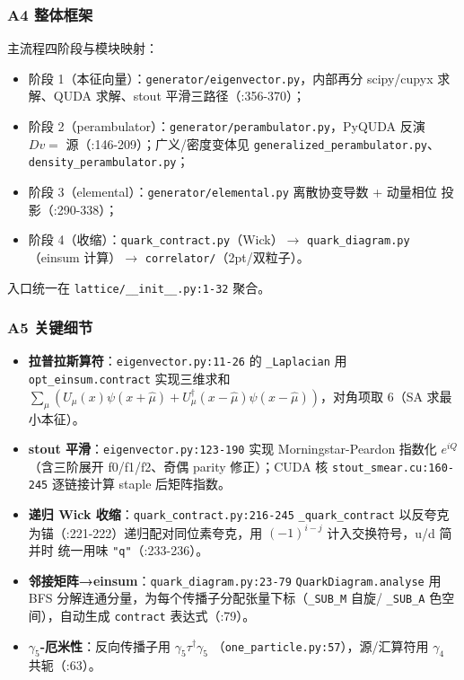 \documentclass[UTF8]{ctexart}
\begin{document}
\subsubsection{A4 整体框架}
主流程四阶段与模块映射：
\begin{itemize}
\item 阶段 1（本征向量）：\texttt{generator/eigenvector.py}，内部再分
scipy/cupyx 求解、QUDA 求解、stout 平滑三路径（:356-370）；
\item 阶段 2（perambulator）：\texttt{generator/perambulator.py}，PyQUDA 反演
$D v = $ 源（:146-209）；广义/密度变体见 \texttt{generalized\_perambulator.py}、
\texttt{density\_perambulator.py}；
\item 阶段 3（elemental）：\texttt{generator/elemental.py} 离散协变导数 + 动量相位
投影（:290-338）；
\item 阶段 4（收缩）：\texttt{quark\_contract.py}（Wick）$\to$ \texttt{quark\_diagram.py}
（einsum 计算）$\to$ \texttt{correlator/}（2pt/双粒子）。
\end{itemize}
入口统一在 \texttt{lattice/\_\_init\_\_.py:1-32} 聚合。

\subsubsection{A5 关键细节}
\begin{itemize}
\item \textbf{拉普拉斯算符}：\texttt{eigenvector.py:11-26} 的 \texttt{\_Laplacian} 用
\texttt{opt\_einsum.contract} 实现三维求和 $\sum_\mu (U_\mu(x)\psi(x+\hat\mu)
+ U_\mu^\dagger(x-\hat\mu)\psi(x-\hat\mu))$，对角项取 $6$（SA 求最小本征）。
\item \textbf{stout 平滑}：\texttt{eigenvector.py:123-190} 实现 Morningstar-Peardon 指数化
$e^{iQ}$（含三阶展开 f0/f1/f2、奇偶 parity 修正）；CUDA 核 \texttt{stout\_smear.cu:160-245}
逐链接计算 staple 后矩阵指数。
\item \textbf{递归 Wick 收缩}：\texttt{quark\_contract.py:216-245} \texttt{\_quark\_contract}
以反夸克为锚（:221-222）递归配对同位素夸克，用 $(-1)^{i-j}$ 计入交换符号，u/d 简并时
统一用味 \texttt{"q"}（:233-236）。
\item \textbf{邻接矩阵→einsum}：\texttt{quark\_diagram.py:23-79} \texttt{QuarkDiagram.analyse}
用 BFS 分解连通分量，为每个传播子分配张量下标（\texttt{\_SUB\_M} 自旋/
\texttt{\_SUB\_A} 色空间），自动生成 \texttt{contract} 表达式（:79）。
\item \textbf{$\gamma_5$-厄米性}：反向传播子用 $\gamma_5 \tau^\dagger \gamma_5$
（\texttt{one\_particle.py:57}），源/汇算符用 $\gamma_4$ 共轭（:63）。
\end{itemize}
\end{document}
